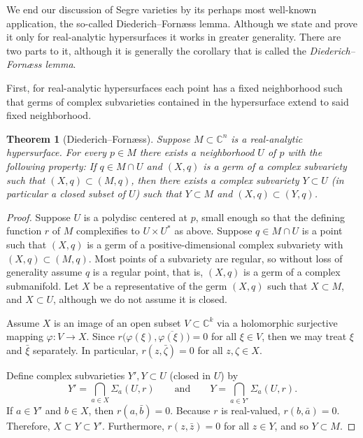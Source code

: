 \documentclass[12pt,openany]{book}
\newcommand{\C}{{\mathbb{C}}}
\newcommand{\myindex}[1]{#1\index{#1}}
\theoremstyle{plain}
\newtheorem{thm}{Theorem}[section]
\theoremstyle{remark}
\theoremstyle{definition}
\theoremstyle{exercise}
\theoremstyle{example}
\begin{document}
We end our discussion of Segre varieties by its perhaps most well-known
application, the so-called Diederich--Forn\ae ss lemma.  Although
we state and prove it only for real-analytic hypersurfaces it works in greater generality.
There are two parts to it, although it is generally the corollary
that is called the \emph{\myindex{Diederich--Forn\ae ss lemma}}.

First, for real-analytic hypersurfaces each point has a fixed neighborhood
such that germs of complex subvarieties contained in the hypersurface extend
to said fixed neighborhood.

\begin{thm}[Diederich--Forn\ae ss]
Suppose $M \subset \C^n$ is a real-analytic hypersurface.  For every
$p \in M$ there exists a neighborhood $U$ of $p$ with the following
property:
If $q \in M \cap U$ and
$(X,q)$ is a germ of a complex subvariety
such that $(X,q) \subset (M,q)$,
then there exists a complex subvariety $Y \subset U$ (in
particular a closed subset of $U$) such that $Y \subset M$ and $(X,q)
\subset (Y,q)$.
\end{thm}

\begin{proof}
Suppose $U$ is a polydisc centered at $p$,
small enough so that the defining function
$r$ of $M$ complexifies to $U \times U^*$ as above.
Suppose $q \in M \cap U$ is a point such that $(X,q)$ is a germ of a
positive-dimensional complex subvariety with $(X,q) \subset (M,q)$.
Most points of a subvariety are regular, so
without loss of generality assume $q$ is a regular point, that is,
$(X,q)$ is a germ of a complex submanifold.
Let $X$ be a representative of the germ $(X,q)$ such that $X \subset M$,
and $X \subset U$, although we do not assume it is closed.

Assume $X$ is an
image of an open subset $V \subset \C^k$ via a holomorphic surjective mapping $\varphi \colon V \to
X$.  Since $r\bigl(\varphi(\xi),\overline{\varphi(\xi)}\bigr) = 0$
for all $\xi \in V$, then we may treat $\xi$ and $\bar{\xi}$ separately.
In particular,
$r(z,\bar{\zeta}) = 0$ for all $z,\zeta \in X$.

Define complex subvarieties $Y', Y \subset U$ (closed in $U$) by
\begin{equation*}
Y' = \bigcap_{a \in X} \Sigma_a(U,r) 
\qquad \text{and} \qquad
Y = \bigcap_{a \in Y'} \Sigma_a(U,r) .
\end{equation*}
If $a \in Y'$ and $b \in X$, then $r(a,\bar{b}) = 0$.
Because $r$ is real-valued,
$r(b,\bar{a}) = 0$.  Therefore,
$X \subset Y \subset Y'$.  Furthermore, $r(z,\bar{z}) = 0$
for all $z \in Y$, and so $Y \subset M$.
\end{proof}
\end{document}
